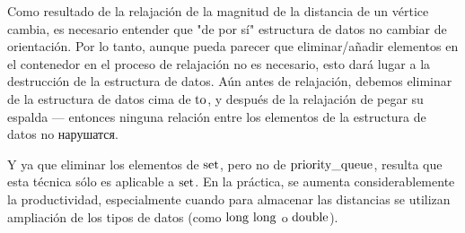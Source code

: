 Como resultado de la relajación de la magnitud de la distancia de un vértice cambia, es necesario entender que "de por sí" estructura de datos no cambiar de orientación. Por lo tanto, aunque pueda parecer que eliminar/añadir elementos en el contenedor en el proceso de relajación no es necesario, esto dará lugar a la destrucción de la estructura de datos. Aún antes de relajación, debemos eliminar de la estructura de datos cima de $\rm to$, y después de la relajación de pegar su espalda --- entonces ninguna relación entre los elementos de la estructura de datos no нарушатся.

Y ya que eliminar los elementos de $\rm set$, pero no de $\rm priority\_queue$, resulta que esta técnica sólo es aplicable a $\rm set$. En la práctica, se aumenta considerablemente la productividad, especialmente cuando para almacenar las distancias se utilizan ampliación de los tipos de datos (como $\rm long\ long$ o $\rm double$).